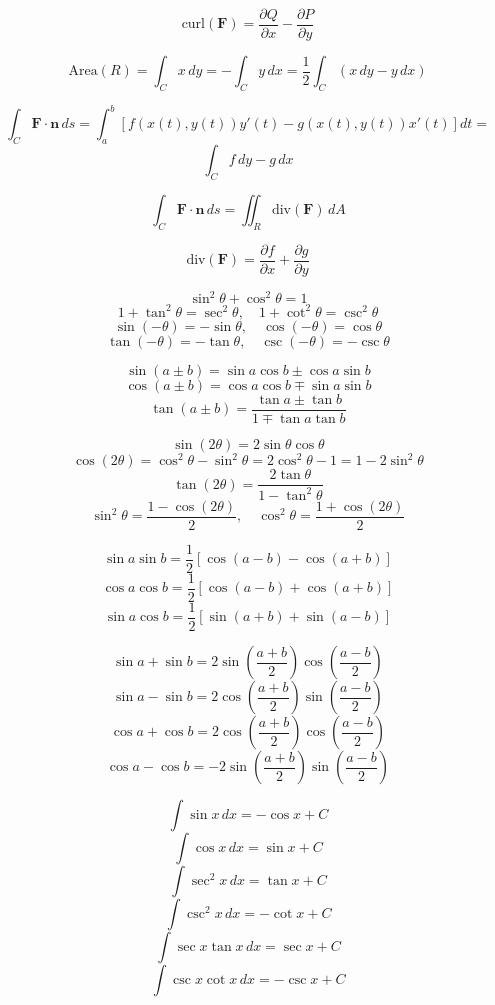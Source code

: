 \documentclass{report}
\begin{document}
\begin{multicols}{2}
	\[
		\text{curl}(\mathbf{F}) = \frac{\partial Q}{\partial x} - \frac{\partial P}{\partial y}
	\]

	\[
		\text{Area}(R) = \int_C x \, dy = -\int_C y \, dx = \frac{1}{2} \int_C (x \, dy - y \, dx)
	\]

	\[
		\int_C \mathbf{F} \cdot \mathbf{n} \, ds = \int_a^b \left[f(x(t), y(t)) y'(t) - g(x(t), y(t)) x'(t)\right] dt =
	\]
	\[
		\int_C f \, dy - g \, dx
	\]

	\[
		\int_C \mathbf{F} \cdot \mathbf{n} \, ds = \iint_R \text{div}(\mathbf{F}) \, dA
	\]

	\[
		\text{div}(\mathbf{F}) = \frac{\partial f}{\partial x} + \frac{\partial g}{\partial y}
	\]
\end{multicols}


\begin{multicols}{2}
    \[
    \sin^2\theta + \cos^2\theta = 1
    \]
    \[
    1 + \tan^2\theta = \sec^2\theta, \quad 1 + \cot^2\theta = \csc^2\theta
    \]
    \[
    \sin(-\theta) = -\sin\theta, \quad \cos(-\theta) = \cos\theta
    \]
    \[
    \tan(-\theta) = -\tan\theta, \quad \csc(-\theta) = -\csc\theta
    \]

    \[
    \sin(a \pm b) = \sin a \cos b \pm \cos a \sin b
    \]
    \[
    \cos(a \pm b) = \cos a \cos b \mp \sin a \sin b
    \]
    \[
    \tan(a \pm b) = \frac{\tan a \pm \tan b}{1 \mp \tan a \tan b}
    \]

    \[
    \sin(2\theta) = 2\sin\theta\cos\theta
    \]
    \[
    \cos(2\theta) = \cos^2\theta - \sin^2\theta = 2\cos^2\theta - 1 = 1 - 2\sin^2\theta
    \]
    \[
    \tan(2\theta) = \frac{2\tan\theta}{1 - \tan^2\theta}
    \]
    \[
    \sin^2\theta = \frac{1 - \cos(2\theta)}{2}, \quad \cos^2\theta = \frac{1 + \cos(2\theta)}{2}
    \]

    \[
    \sin a \sin b = \frac{1}{2} [\cos(a - b) - \cos(a + b)]
    \]
    \[
    \cos a \cos b = \frac{1}{2} [\cos(a - b) + \cos(a + b)]
    \]
    \[
    \sin a \cos b = \frac{1}{2} [\sin(a + b) + \sin(a - b)]
    \]

    \[
    \sin a + \sin b = 2 \sin\left(\frac{a+b}{2}\right) \cos\left(\frac{a-b}{2}\right)
    \]
    \[
    \sin a - \sin b = 2 \cos\left(\frac{a+b}{2}\right) \sin\left(\frac{a-b}{2}\right)
    \]
    \[
    \cos a + \cos b = 2 \cos\left(\frac{a+b}{2}\right) \cos\left(\frac{a-b}{2}\right)
    \]
    \[
    \cos a - \cos b = -2 \sin\left(\frac{a+b}{2}\right) \sin\left(\frac{a-b}{2}\right)
    \]

    \[
    \int \sin x \, dx = -\cos x + C
    \]
    \[
    \int \cos x \, dx = \sin x + C
    \]
    \[
    \int \sec^2 x \, dx = \tan x + C
    \]
    \[
    \int \csc^2 x \, dx = -\cot x + C
    \]
    \[
    \int \sec x \tan x \, dx = \sec x + C
    \]
    \[
    \int \csc x \cot x \, dx = -\csc x + C
    \]


\end{multicols}
\end{document}
